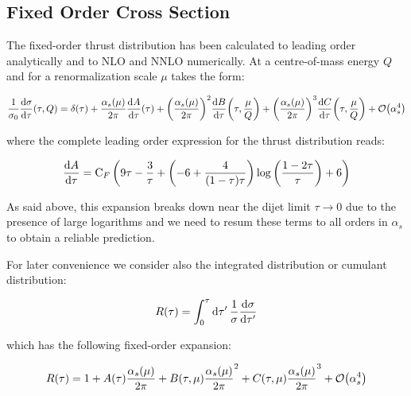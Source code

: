 \documentclass[../main.tex]{subfiles}
\begin{document}
\subsection{Fixed Order Cross Section}

The fixed-order thrust distribution has been calculated to leading order analytically and
to NLO and NNLO numerically. At a centre-of-mass energy $Q$ and for a renormalization scale $\mu$ takes the form:

\begin{equation}\label{eq:Fixed_order}
    \frac{1}{\sigma_0} \dv{\sigma}{\tau} \qty(\tau,Q) = \delta(\tau) + \frac{\alpha_s(\mu)}{2\pi}\dv{A}{\tau} \qty(\tau) + \qty(\frac{\alpha_s(\mu)}{2\pi})^2 \dv{B}{\tau} \qty(\tau,\frac{\mu}{Q}) + \qty(\frac{\alpha_s(\mu)}{2\pi})^3 \dv{C}{\tau} \qty(\tau,\frac{\mu}{Q}) + \order{\alpha_s^4}
\end{equation}

where the complete leading order expression for the thrust distribution reads\cite{Ellis:1980wv}:

\begin{equation}\label{eq:Fixed_order_A}
    \dv{A}{\tau}(\tau) =  \text{C}_F \left(9 \tau -\frac{3}{\tau }+\left(-6 +\frac{4}{(1-\tau ) \tau }\right) \log \left(\frac{1-2 \tau }{\tau }\right)+6\right)
\end{equation}

As said above, this expansion breaks down near the dijet limit $\tau \to 0$ due to the presence of large logarithms and 
we need to resum these terms to all orders in $\alpha_s$ to obtain a reliable prediction.

For later convenience we consider also the integrated distribution or cumulant distribution:

\begin{equation}
    R(\tau) = \int_0^\tau \dd{\tau'} \frac{1}{\sigma}\dv{\sigma}{\tau'} 
\end{equation}

which has the following fixed-order expansion:

\begin{equation}\label{eq:Fixed_order_R}
    R(\tau) = 1 + A(\tau) \frac{\alpha_s(\mu)}{2\pi} + B(\tau,\mu) \frac{\alpha_s(\mu)}{2\pi}^2 + C(\tau,\mu)\frac{\alpha_s(\mu)}{2\pi}^3 + \order{\alpha_s^4}
\end{equation}
\end{document}
